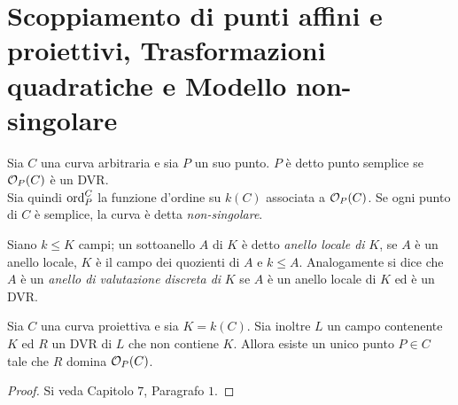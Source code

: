 \section{Scoppiamento di punti affini e proiettivi, Trasformazioni quadratiche e Modello non-singolare}
    Sia $C$ una curva arbitraria e sia $P$ un suo punto. $P$ è detto punto semplice se  $\mathcal{O}_P(C)$ è un DVR.\\
    Sia quindi $\operatorname{ord}_P^C$ la funzione d'ordine su $k(C)$ associata a $\mathcal{O}_P(C)$. Se ogni punto di $C$ è semplice, la curva è detta \emph{non-singolare}.
    \begin{definizione}
        Siano $k \leq K$ campi; un sottoanello $A$ di $K$ è detto \emph{anello locale di} $K$, se $A$ è un anello locale, $K$ è il campo dei quozienti di $A$ e $k \leq A$. Analogamente si dice che $A$ è un  \emph{anello di valutazione discreta di} $K$ se $A$ è un anello locale 
        di $K$ ed è un DVR.
    \end{definizione}
    \begin{proposizione} \label{prop:techn2}
        Sia $C$ una curva proiettiva e sia $K = k(C)$. Sia inoltre $L$ un campo contenente $K$ ed $R$ un DVR di $L$ che non contiene $K$. Allora esiste un unico punto $P \in C$ tale che $R$ domina $\mathcal{O}_P(C)$.
    \end{proposizione}
    \begin{proof}
        Si veda \cite{fulton} Capitolo $7$, Paragrafo $1$.
    \end{proof}
